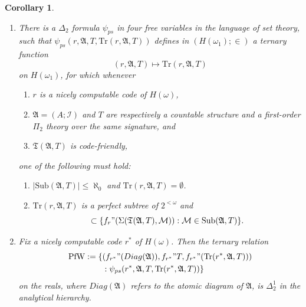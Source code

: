 \documentclass[12pt, twoside]{memoir}
\numberwithin{equation}{section}
\newtheorem{cor}[thm]{Corollary}
\theoremstyle{definition}
\theoremstyle{remark}
\theoremstyle{definition}
\theoremstyle{definition}
\theoremstyle{definition}
\theoremstyle{remark}
\begin{document}
\begin{cor}\label{rlcor2nd}
\leavevmode
\begin{enumerate}[label=(\Roman*)]
    \item\label{6330i} There is a $\Delta_2$ formula $\psi_{ps}$ in four free variables in the language of set theory, such that $\psi_{ps}(r, \mathfrak{A}, T, \mathrm{Tr}(r, \mathfrak{A}, T))$ defines in $(H(\omega_1); \in)$ a ternary function $$(r, \mathfrak{A}, T) \mapsto \mathrm{Tr}(r, \mathfrak{A}, T)$$ on $H(\omega_1)$, for which whenever 
    \begin{enumerate}[label=(\alph*)]
        \item\label{6330ia} $r$ is a nicely computable code of $H(\omega)$,
        \item\label{6330ib} $\mathfrak{A} = (A; \mathcal{I})$ and $T$ are respectively a countable structure and a first-order $\Pi_2$ theory over the same signature, and
        \item\label{6330ic} $\mathfrak{T}(\mathfrak{A}, T)$ is code-friendly,
    \end{enumerate} 
    one of the following must hold:
    \begin{enumerate}[label=(\arabic*)]
        \item\label{6330i1} $|\mathrm{Sub}(\mathfrak{A}, T)| \leq \aleph_0$ and $\mathrm{Tr}(r, \mathfrak{A}, T) = \emptyset$.
        \item\label{6330i2} $\mathrm{Tr}(r, \mathfrak{A}, T)$ is a perfect subtree of $2^{< \omega}$ and
        \begin{equation*}
            [\mathrm{Tr}(r, \mathfrak{A}, T)] \subset \{f_r" (\Sigma(\mathfrak{T}(\mathfrak{A}, T), \mathcal{M})) : \mathcal{M} \in \mathrm{Sub}(\mathfrak{A}, T)\} \text{.}
        \end{equation*}
    \end{enumerate}
    \item\label{6330ii} Fix a nicely computable code $r^*$ of $H(\omega)$. Then the ternary relation
    \begin{align*}
        \mathrm{PfW} := \{ & (f_{r^*}" (Diag(\mathfrak{A})), f_{r^*}" T, f_{r^*}" (\mathrm{Tr}(r^*, \mathfrak{A}, T))) \\
        & : \psi_{ps}(r^*, \mathfrak{A}, T, \mathrm{Tr}(r^*, \mathfrak{A}, T))\}
    \end{align*}
    on the reals, where $Diag(\mathfrak{A})$ refers to the atomic diagram of $\mathfrak{A}$, is $\Delta^1_2$ in the analytical hierarchy.
\end{enumerate}
\end{cor}
\end{document}
